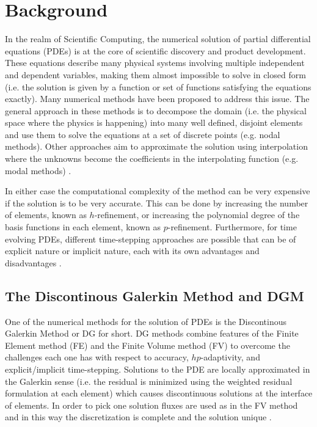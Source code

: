 \documentclass{ccr16}
\begin{document}
    \section{Background}
    {
        \label{PDBM:sec:background}

        In the realm of Scientific Computing, the numerical solution of partial differential equations (PDEs) is at the core of scientific discovery and product development. These equations describe many physical systems involving multiple independent and dependent variables, making them almost impossible to solve in closed form (i.e. the solution is given by a function or set of functions satisfying the equations exactly). Many numerical methods have been proposed to address this issue. The general approach in these methods is to decompose the domain (i.e. the physical space where the physics is happening) into many well defined, disjoint elements and use them to solve the equations at a set of discrete points (e.g. nodal methods). Other approaches aim to approximate the solution using interpolation where the unknowns become the coefficients in the interpolating function (e.g. modal methods) \cite{PDBM:Ciarlet02, PDBM:Constantine14, PDBM:Hutton03}.

        In either case the computational complexity of the method can be very expensive if the solution is to be very accurate. This can be done by increasing the number of elements, known as $h$-refinement, or increasing the polynomial degree of the basis functions in each element, known as $p$-refinement. Furthermore, for time evolving PDEs, different time-stepping approaches are possible that can be of explicit nature or implicit nature, each with its own advantages and disadvantages \cite{PDBM:Subbaraj89, PDBM:Dokainish89}.

        \subsection{The Discontinous Galerkin Method and DGM}
        {
            One of the numerical methods for the solution of PDEs is the Discontinous Galerkin Method or DG for short. DG methods combine features of the Finite Element method (FE) and the Finite Volume method (FV) to overcome the challenges each one has with respect to accuracy, $hp$-adaptivity, and explicit/implicit time-stepping. Solutions to the PDE are locally approximated in the Galerkin sense (i.e. the residual is minimized using the weighted residual formulation at each element) which causes discontinuous solutions at the interface of elements. In order to pick one solution fluxes are used as in the FV method and in this way the discretization is complete and the solution unique \cite{PDBM:Hesthaven08}.

}}
\end{document}
